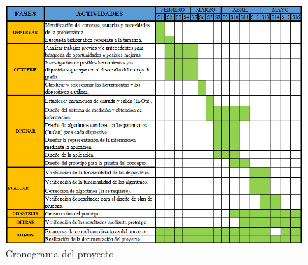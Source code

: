 		\begin{figure}
			\begin{center}
				\includegraphics{img/cronopng4_5.png}
			\end{center}
			\caption{Cronograma del proyecto. \label{cronograma}}
		\end{figure}

